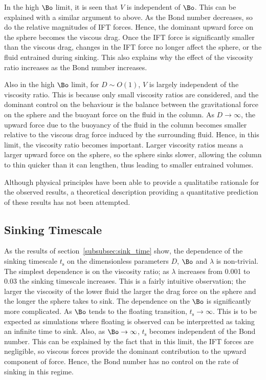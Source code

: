 {In the high $\Bo$ limit, it is seen that $V$ is independent of $\Bo$. This can be explained with a similar argument to above. As the Bond number decreases, so do the relative magnitudes of IFT forces. Hence, the dominant upward force on the sphere becomes the viscous drag. Once the IFT force is significantly smaller than the viscous drag, changes in the IFT force no longer affect the sphere, or the fluid entrained during sinking. This also explains why the effect of the viscosity ratio increases as the Bond number increases. 

Also in the high $\Bo$ limit, for $D \sim O(1)$, $V$ is largely independent of the viscosity ratio. This is because only small viscosity ratios are considered, and the dominant control on the behaviour is the balance between the gravitational force on the sphere and the buoyant force on the fluid in the column. As $D \to \infty$, the upward force due to the buoyancy of the fluid in the column becomes smaller relative to the viscous drag force induced by the surrounding fluid. Hence, in this limit, the viscosity ratio becomes important. Larger viscosity ratios means a larger upward force on the sphere, so the sphere sinks slower, allowing the column to thin quicker than it can lengthen, thus leading to smaller entrained volumes.

Although physical principles have been able to provide a qualitatibe rationale for the observed results, a theoretical description providing a quantitative prediction of these results has not been attempted. 

\subsection{Sinking Timescale}
\label{subsec:diss_sink_time}

As the results of section~\ref{subsubsec:sink_time} show, the dependence of the sinking timescale $t_{\text{s}}$ on the dimensionless parameters $D$, $\Bo$ and $\lambda$ is non-trivial. The simplest dependence is on the viscosity ratio; as $\lambda$ increases from 0.001 to 0.03 the sinking timescale increases. This is a fairly intuitive observation; the larger the viscosity of the lower fluid the larger the drag force on the sphere and the longer the sphere takes to sink. The dependence on the $\Bo$ is significantly more complicated. As $\Bo$ tends to the floating transition, $t_{\text{s}} \to \infty$. This is to be expected as simulations where floating is observed can be interpretted as taking an infinite time to sink. Also, as $\Bo \to \infty$, $t_{\text{s}}$ becomes independent of the Bond number. This can be explained by the fact that in this limit, the IFT forces are negligible, so viscous forces provide the dominant contribution to the upward component of force. Hence, the Bond number has no control on the rate of sinking in this regime.

}
